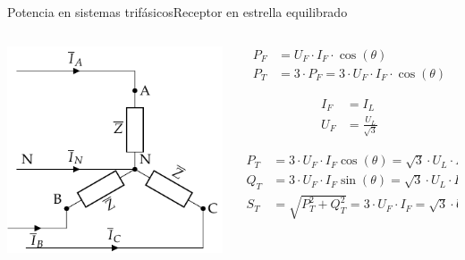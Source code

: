 \documentclass[aspectratio=169, xcolor={usenames,svgnames,dvipsnames}]{beamer}
\begin{document}
\begin{frame}{Potencia en sistemas trifásicos}{Receptor en estrella equilibrado}
\begin{columns}
\begin{column}{0.4\columnwidth}
\begin{center}
\includegraphics[width=.9\linewidth]{../figs/EstrellaEquilibrado_Receptor.pdf}
\end{center}
\end{column}

\begin{column}{0.6\columnwidth}
\begin{align*}
P_F &= U_F\cdot I_F\cdot\cos(\theta)\\
  P_T &= 3 \cdot P_F= 3 \cdot U_F\cdot I_F \cdot\cos(\theta)
\end{align*}

\begin{align*}
  I_F &= I_L\\
  U_F &= \frac{U_L}{\sqrt{3}}
\end{align*}

\begin{align*}
  P_T &= 3\cdot U_F \cdot I_F \cos(\theta) = \sqrt{3}\cdot  U_L \cdot I_L\cdot \cos(\theta)\\
  Q_T &= 3\cdot U_F \cdot I_F \sin(\theta) = \sqrt{3}\cdot  U_L \cdot I_L\cdot \sin(\theta)\\
  S_T &= \sqrt{P_T^2 + Q_T^2} = 3\cdot U_F\cdot I_F = \sqrt{3}\cdot U_L\cdot I_L
\end{align*}
\end{column}
\end{columns}
\end{frame}
\end{document}
